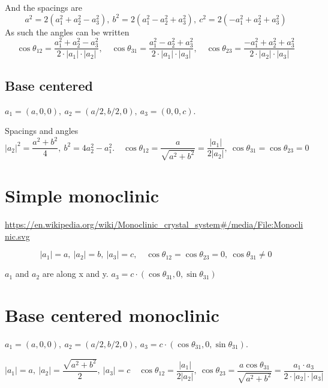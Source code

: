 \documentclass[a4paper,10pt]{article} 	%
\numberwithin{equation}{section}
\begin{document}
	And the spacings are
	\begin{equation}\label{key}
		a^2 = 2 (a_1^2+a_2^2-a_3^2), \ b^2 = 2(a_1^2-a_2^2+a_3^2), \ c^2 = 2(-a_1^2+a_2^2+a_3^2)
	\end{equation}
	As such the angles can be written
	\begin{equation}\label{key}
		\cos \theta_{12} = \frac{a_1^2+a_2^2-a_3^2}{2 \cdot |a_1| \cdot |a_2|}, \quad
		\cos \theta_{31} = \frac{a_1^2-a_2^2+a_3^2}{2 \cdot |a_1| \cdot |a_3|}, \quad
		\cos \theta_{23} = \frac{-a_1^2+a_2^2+a_3^2}{2 \cdot |a_2| \cdot |a_3|}
	\end{equation}
	
	
	\subsection{Base centered}
	$ a_1 = (a,0,0),\ a_2 = (a/2,b/2,0),\ a_3 = (0,0,c) $.
	
	Spacings and angles
	\begin{equation}\label{key}
	|a_2|^2 = \frac{a^2+b^2}{4}, \ b^2 = 4a_2^2-a_1^2. \quad \cos \theta_{12} = \frac{a}{\sqrt{a^2+b^2}} = \frac{|a_1|}{2|a_2|}, \ \cos\theta_{31} = \cos \theta_{23} = 0
	\end{equation}
	
	\section{Simple monoclinic}
	\url{https://en.wikipedia.org/wiki/Monoclinic_crystal_system#/media/File:Monoclinic.svg}

	\begin{equation}\label{key}
		|a_1| = a,\ |a_2| = b,\ |a_3| = c, \quad \cos \theta_{12} = \cos \theta_{23} = 0, \ \cos \theta_{31} \neq 0
	\end{equation}
	
	$a_1$ and $a_2$ are along x and y. $a_3 = c \cdot (\cos \theta_{31},0,\sin \theta_{31})$
	
	\section{Base centered monoclinic}
	$ a_1 = (a,0,0),\ a_2 =(a/2, b/2,0),\ a_3 = c \cdot (\cos \theta_{31},0,\sin \theta_{31}) $.
	
	\begin{equation}\label{key}
	|a_1| = a,\ |a_2| = \frac{\sqrt{a^2+b^2}}{2}, \ |a_3| = c \quad \cos \theta_{12} = \frac{|a_1|}{2|a_2|}, \ \cos \theta_{23} = \frac{a\cos\theta_{31}}{\sqrt{a^2+b^2}} = \frac{a_1 \cdot a_3}{2 \cdot |a_2| \cdot |a_3|}
	\end{equation}
	
\end{document}

